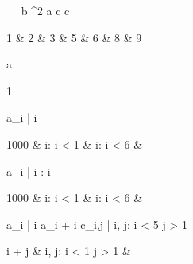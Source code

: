 \begin{eqcode}{\mu}{\ }{\ }{}
  b ^2 \lend
  a \in {} \lend
  c \in {} \lend
  c \gets \begin{tmatrix}
    1 & 2 & 3  & 5 & 6  & 8 & 9 \lend
  \end{tmatrix} \lend
   \lend
  a \gets 
  \begin{tmatrix}
    1   \lend
  \end{tmatrix} \lend
   \lend
  a_i | \forall i \gets 
  \begin{cases}
    1000 & i: i < 1  & i: i < 6  & \otherwise \lend
  \end{cases}\lend
   \lend
  a_i | i : i  \gets
  \begin{cases}
    1000 & i: i < 1  & i: i < 6  & \otherwise \lend
  \end{cases}\lend
   \lend
  a_i | \forall i \gets a_i  + i \lend
   \lend
  c_{i,j} | i, j: i < 5 \cap j > 1 \gets 
  \begin{cases}
    i + j & i, j: i < 1 \cap j > 1  & \otherwise \lend
  \end{cases} \lend
   \lend
   \lend
\end{eqcode}
